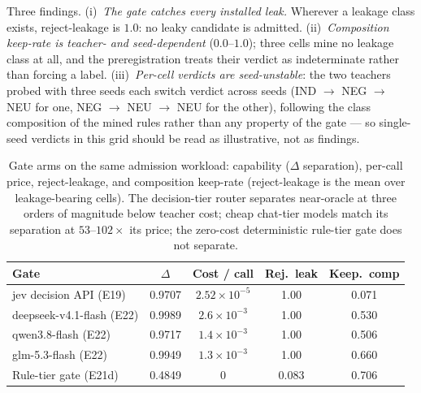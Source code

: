 \documentclass[11pt]{article}
\theoremstyle{plain}
\begin{document}
Three findings. (i)~\emph{The gate catches every installed leak.} Wherever a
leakage class exists, reject-leakage is $1.0$: no leaky candidate is admitted.
(ii)~\emph{Composition keep-rate is teacher- and seed-dependent} ($0.0$--$1.0$);
three cells mine no leakage class at all, and the preregistration treats their
verdict as indeterminate rather than forcing a label. (iii)~\emph{Per-cell
verdicts are seed-unstable}: the two teachers probed with three seeds each
switch verdict across seeds (IND $\to$ NEG $\to$ NEU for one, NEG $\to$ NEU
$\to$ NEU for the other), following the class composition of the mined rules
rather than any property of the gate --- so single-seed verdicts in this grid
should be read as illustrative, not as findings.

\begin{table}[t]
\centering
\caption{Gate arms on the same admission workload: capability ($\Delta$
separation), per-call price, reject-leakage, and composition keep-rate
(reject-leakage is the mean over leakage-bearing cells). The
decision-tier router separates near-oracle at three orders of magnitude below
teacher cost; cheap chat-tier models match its separation at $53$--$102\times$
its price; the zero-cost deterministic rule-tier gate does not separate.}
\label{tab:gate-arms}
\begin{tabular}{lcccc}
\toprule
Gate & $\Delta$ & Cost / call & Rej.\ leak & Keep.\ comp\\
\midrule
jev decision API (E19) & 0.9707 & $2.52\times10^{-5}$ & 1.00 & 0.071\\
deepseek-v4.1-flash (E22) & 0.9989 & $2.6\times10^{-3}$ & 1.00 & 0.530\\
qwen3.8-flash (E22) & 0.9717 & $1.4\times10^{-3}$ & 1.00 & 0.506\\
glm-5.3-flash (E22) & 0.9949 & $1.3\times10^{-3}$ & 1.00 & 0.660\\
Rule-tier gate (E21d) & 0.4849 & $0$ & 0.083 & 0.706\\
\bottomrule
\end{tabular}

\end{table}
\end{document}

